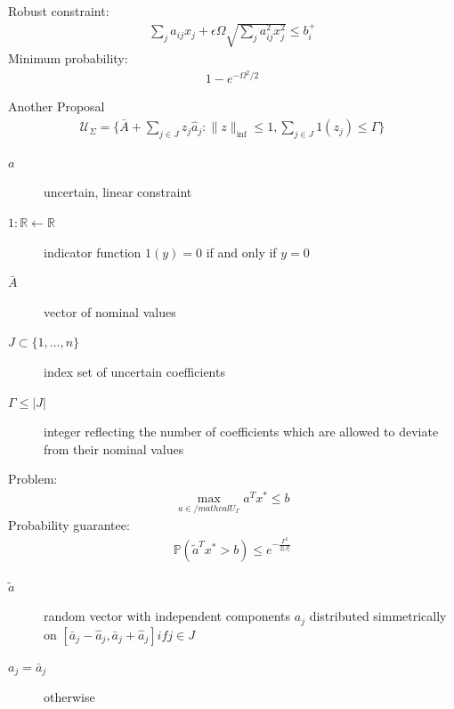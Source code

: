 \documentclass{beamer}
\begin{document}
\begin{frame}{}
Robust constraint:
\begin{align*}
\sum_{j}a_{ij}x_{j} + \epsilon \Omega \sqrt{\sum_{j}a_{ij}^{2}x_{j}^{2}} \leq b_{i}^{+}
\end{align*}
Minimum probability:
\begin{align*}
1 - e^{-\Omega^{2}/2}
\end{align*}
\end{frame}

\begin{frame}{Another Proposal}
\begin{align*}
\mathcal{U}_{\Sigma} = \{
        \bar{A} + \sum_{j \in J}z_{j}\hat{a}_{j} : \lVert z \rVert_{\inf} \leq 1, \sum_{j \in J} 1(z_{j}) \leq \Gamma
    \}
\end{align*}
\begin{description}
\item [$a$] uncertain, linear constraint
\item [$1 : \mathbb{R} \leftarrow \mathbb{R}$] indicator function $1(y) = 0$ if and only if $y = 0$
\item [$\bar{A}$] vector of nominal values
\item [$J \subset \{1,\dots,n\}$] index set of uncertain coefficients
\item [$\Gamma \leq \lvert J \rvert$] integer reflecting the number of coefficients which are allowed to deviate from their nominal values
\end{description}
\end{frame}

\begin{frame}{}
Problem:
\begin{align*}
\label{eq:bertsimas_sim_model}
\max_{a \in /mathcal{U}_{\Gamma}}a^{T}x^{*} \leq b
\end{align*}
Probability guarantee:
\begin{align*}
\mathbb{P}(\tilde{a}^{T}x^{*} > b) \leq e^{- \frac{\Gamma^{2}}{2 \lvert J \rvert}}
\end{align*}
\begin{description}
\item [$\tilde{a}$] random vector with independent components $a_{j}$ distributed simmetrically on $[\bar{a}_{j} - \hat{a}_{j}, \bar{a}_{j} + \hat{a}_{j}] if j \in J$
\item [$a_{j} = \bar{a}_{j}$] otherwise
\end{description}
\end{frame}
\end{document}
